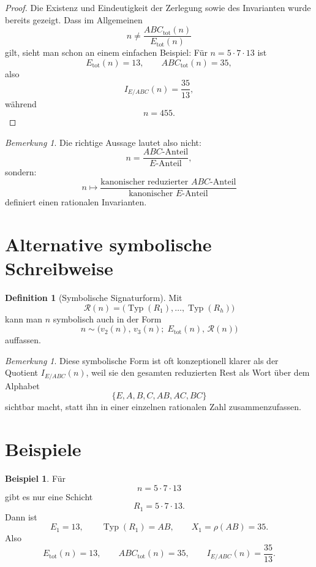 \documentclass[11pt,a4paper]{article}
\theoremstyle{definition}
\newtheorem{definition}[satz]{Definition}
\newtheorem{beispiel}[satz]{Beispiel}
\theoremstyle{remark}
\newtheorem{bemerkung}[satz]{Bemerkung}
\newcommand{\Typ}{\operatorname{Typ}}
\newcommand{\Rest}{\mathcal{R}}
\begin{document}
	\begin{proof}
		Die Existenz und Eindeutigkeit der Zerlegung sowie des Invarianten wurde bereits gezeigt.
		Dass im Allgemeinen
		\[
		n\neq \frac{ABC_{\mathrm{tot}}(n)}{E_{\mathrm{tot}}(n)}
		\]
		gilt, sieht man schon an einem einfachen Beispiel: Für \(n=5\cdot 7\cdot 13\) ist
		\[
		E_{\mathrm{tot}}(n)=13,\qquad ABC_{\mathrm{tot}}(n)=35,
		\]
		also
		\[
		I_{E/ABC}(n)=\frac{35}{13},
		\]
		während
		\[
		n=455.
		\]
	\end{proof}
	
	\begin{bemerkung}
		Die richtige Aussage lautet also nicht:
		\[
		n=\frac{\text{\(ABC\)-Anteil}}{\text{\(E\)-Anteil}},
		\]
		sondern:
		\[
		n \longmapsto \frac{\text{kanonischer reduzierter \(ABC\)-Anteil}}{\text{kanonischer \(E\)-Anteil}}
		\]
		definiert einen rationalen Invarianten.
	\end{bemerkung}
	
	\section{Alternative symbolische Schreibweise}
	
	\begin{definition}[Symbolische Signaturform]
		Mit
		\[
		\Rest(n)=\bigl(\Typ(R_1),\dots,\Typ(R_h)\bigr)
		\]
		kann man \(n\) symbolisch auch in der Form
		\[
		n \sim \bigl(v_2(n),\,v_3(n);\;E_{\mathrm{tot}}(n),\,\Rest(n)\bigr)
		\]
		auffassen.
		\]
	\end{definition}
	
	\begin{bemerkung}
		Diese symbolische Form ist oft konzeptionell klarer als der Quotient \(I_{E/ABC}(n)\), weil sie
		den gesamten reduzierten Rest als Wort über dem Alphabet
		\[
		\{E,A,B,C,AB,AC,BC\}
		\]
		sichtbar macht, statt ihn in einer einzelnen rationalen Zahl zusammenzufassen.
	\end{bemerkung}
	
	\section{Beispiele}
	
	\begin{beispiel}
		Für
		\[
		n=5\cdot 7\cdot 13
		\]
		gibt es nur eine Schicht
		\[
		R_1=5\cdot 7\cdot 13.
		\]
		Dann ist
		\[
		E_1=13,\qquad \Typ(R_1)=AB,\qquad X_1=\rho(AB)=35.
		\]
		Also
		\[
		E_{\mathrm{tot}}(n)=13,\qquad
		ABC_{\mathrm{tot}}(n)=35,
		\qquad
		I_{E/ABC}(n)=\frac{35}{13}.
		\]
	\end{beispiel}
	
\end{document}
